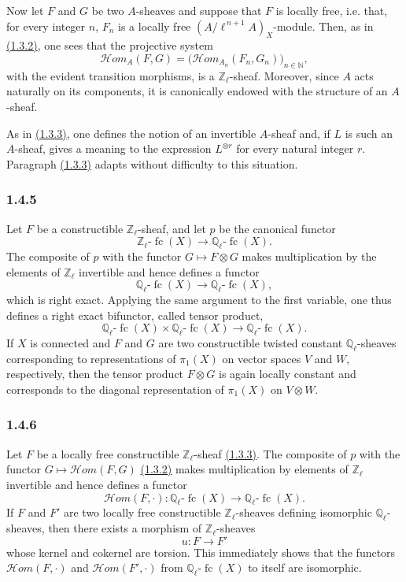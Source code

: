 \documentclass[11pt]{article}
\providecommand{\cHom}{\mathcal{H}om}
\providecommand{\fc}{\operatorname{fc}}
\begin{document}
Now let \(F\) and \(G\) be two \(A\)-sheaves and suppose that \(F\) is locally free, i.e. that, for every integer \(n\), \(F_n\) is a locally free \((A/\ell^{\,n+1}A)_X\)-module. Then, as in \hyperref[sga5:VI:proposition:1.3.2]{(1.3.2)}, one sees that the projective system
\[
\cHom_A(F,G)=\bigl(\cHom_{A_n}(F_n,G_n)\bigr)_{n\in\mathbb N},
\]
with the evident transition morphisms, is a \(\mathbb Z_\ell\)-sheaf. Moreover, since \(A\) acts naturally on its components, it is canonically endowed with the structure of an \(A\)-sheaf.

As in \hyperref[sga5:VI:subsubsection:1.3.3]{(1.3.3)}, one defines the notion of an invertible \(A\)-sheaf and, if \(L\) is such an \(A\)-sheaf, gives a meaning to the expression \(L^{\otimes r}\) for every natural integer \(r\). Paragraph \hyperref[sga5:VI:subsubsection:1.3.3]{(1.3.3)} adapts without difficulty to this situation.

\subsubsection*{1.4.5}\label{sga5:VI:subsubsection:1.4.5}
Let \(F\) be a constructible \(\mathbb Z_\ell\)-sheaf, and let \(p\) be the canonical functor
\[
\mathbb Z_\ell\text{-}\fc(X)\longrightarrow \mathbb Q_\ell\text{-}\fc(X).
\]
The composite of \(p\) with the functor \(G\mapsto F\otimes G\) makes multiplication by the elements of \(\mathbb Z_\ell\) invertible and hence defines a functor
\[
\mathbb Q_\ell\text{-}\fc(X)\longrightarrow \mathbb Q_\ell\text{-}\fc(X),
\]
which is right exact. Applying the same argument to the first variable, one thus defines a right exact bifunctor, called tensor product,
\[
\mathbb Q_\ell\text{-}\fc(X)\times \mathbb Q_\ell\text{-}\fc(X)
\longrightarrow \mathbb Q_\ell\text{-}\fc(X).
\]
If \(X\) is connected and \(F\) and \(G\) are two constructible twisted constant \(\mathbb Q_\ell\)-sheaves corresponding to representations of \(\pi_1(X)\) on vector spaces \(V\) and \(W\), respectively, then the tensor product \(F\otimes G\) is again locally constant and corresponds to the diagonal representation of \(\pi_1(X)\) on \(V\otimes W\).

\subsubsection*{1.4.6}\label{sga5:VI:subsubsection:1.4.6}
Let \(F\) be a locally free constructible \(\mathbb Z_\ell\)-sheaf \hyperref[sga5:VI:subsubsection:1.3.3]{(1.3.3)}. The composite of \(p\) with the functor \(G\mapsto\cHom(F,G)\) \hyperref[sga5:VI:proposition:1.3.2]{(1.3.2)} makes multiplication by elements of \(\mathbb Z_\ell\) invertible and hence defines a functor
\[
\cHom(F,\cdot):\mathbb Q_\ell\text{-}\fc(X)\longrightarrow \mathbb Q_\ell\text{-}\fc(X).
\]
If \(F\) and \(F'\) are two locally free constructible \(\mathbb Z_\ell\)-sheaves defining isomorphic \(\mathbb Q_\ell\)-sheaves, then there exists a morphism of \(\mathbb Z_\ell\)-sheaves
\[
u:F\longrightarrow F'
\]
whose kernel and cokernel are torsion. This immediately shows that the functors \(\cHom(F,\cdot)\) and \(\cHom(F',\cdot)\) from \(\mathbb Q_\ell\text{-}\fc(X)\) to itself are isomorphic.
\end{document}
